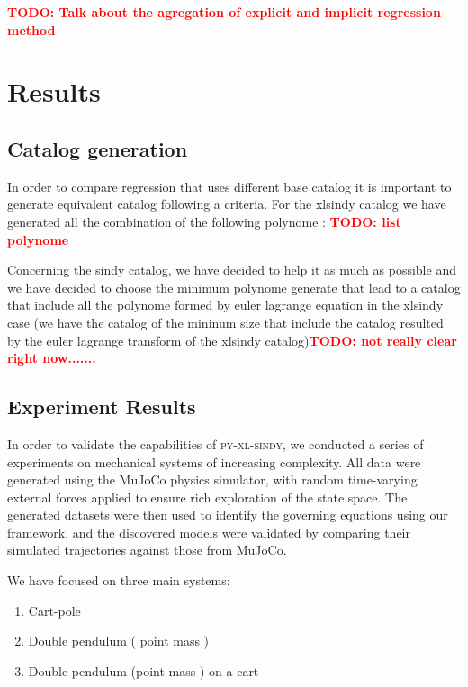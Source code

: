 \documentclass[12pt]{article}
\newcommand{\frameworkname}{\textsc{py-xl-sindy}}
\newcommand{\TODO}[1]{\textbf{\textcolor{red}{\Large TODO: \normalsize #1}}}
\begin{document}
\TODO{Talk about the agregation of explicit and implicit regression method}


\section*{Results}

\subsection*{Catalog generation}

In order to compare regression that uses different base catalog it is important to generate equivalent catalog following a criteria. For the xlsindy catalog we have generated all the combination of the following polynome : 
\TODO{list polynome}

Concerning the sindy catalog, we have decided to help it as much as possible and we have decided to choose the minimum polynome generate that lead to a catalog that include all the polynome formed by euler lagrange equation in the xlsindy case (we have the catalog of the mininum size that include the catalog resulted by the euler lagrange transform of the xlsindy catalog)\TODO{not really clear right now.......}

\subsection*{Experiment Results}

In order to validate the capabilities of \frameworkname, we conducted a series of experiments on mechanical systems of increasing complexity. All data were generated using the MuJoCo physics simulator, with random time-varying external forces applied to ensure rich exploration of the state space. The generated datasets were then used to identify the governing equations using our framework, and the discovered models were validated by comparing their simulated trajectories against those from MuJoCo.

We have focused on three main systems:
\begin{enumerate}
	\item Cart-pole
	\item Double pendulum ( point mass )
	\item Double pendulum (point mass ) on a cart
\end{enumerate}
\end{document}
